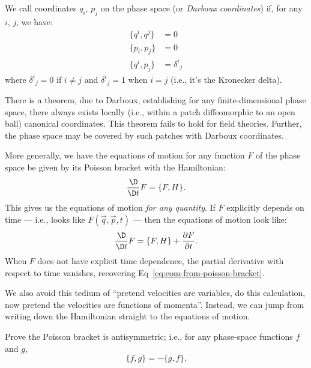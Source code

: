 \begin{definition}
We call coordinates $q_{i}$, $p_{j}$ on the phase
space  (or \emph{Darboux coordinates}) if,
for any $i$, $j$, we have:
\begin{subequations}
\begin{align}
\{q^{i}, q^{j}\} &= 0\\
\{p_{i}, p_{j}\} &= 0\\
\{q^{i}, p_{j}\} &= {\delta^{i}}_{j}
\end{align}
\end{subequations}
where ${\delta^{i}}_{j}=0$ if $i\neq j$ and ${\delta^{i}}_{j}=1$ when $i=j$
(i.e., it's the Kronecker delta).
\end{definition}

\begin{remark}
There is a theorem, due to Darboux, establishing for any
finite-dimensional phase space, there always exists locally (i.e.,
within a patch diffeomorphic to an open ball) canonical coordinates.
This theorem fails to hold for field theories. Further, the phase space
may be covered by such patches with Darboux coordinates.
\end{remark}

\M
More generally, we have the equations of motion for any function $F$ of
the phase space be given by its Poisson bracket with the Hamiltonian:
\begin{equation}\label{eq:eom-from-poisson-bracket}
\frac{\D}{\D t}F = \{F, H\}.
\end{equation}
This gives us the equations of motion \emph{for any quantity}. If $F$
explicitly depends on time --- i.e., looks like $F(\vec{q},\vec{p},t)$
--- then the equations of motion look like:
\begin{equation}
\frac{\D}{\D t}F = \{F, H\} + \frac{\partial F}{\partial t}.
\end{equation}
When $F$ does not have explicit time dependence, the partial derivative
with respect to time vanishes, recovering Eq~\eqref{eq:eom-from-poisson-bracket}.

We also avoid this tedium of ``pretend velocities are variables, do this
calculation, now pretend the velocities are functions of momenta''.
Instead, we can jump from writing down the Hamiltonian straight to the
equations of motion.

\begin{exercise}
Prove the Poisson bracket is antisymmetric; i.e., for any phase-space
functions $f$ and $g$,
\begin{equation*}
\{f,g\} = -\{g,f\}.
\end{equation*}
\end{exercise}

